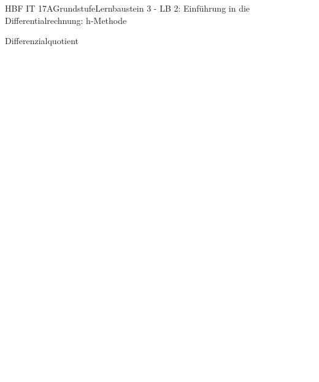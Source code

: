 \documentclass[oneside,openany,headings=optiontotoc,11pt,numbers=noenddot]{scrreprt}
\begin{document}
\begin{worksheet}{HBF IT 17A}{Grundstufe}{Lernbaustein 3 - LB 2: Einführung in die Differentialrechnung: h-Methode}
		\begin{framed}
			\noindent
			\tiny{\color{codegray}Differenzialquotient}\\
			\includegraphics[scale=0.39]{../empty.jpg}
		\end{framed}
	\end{worksheet}
\end{document}
